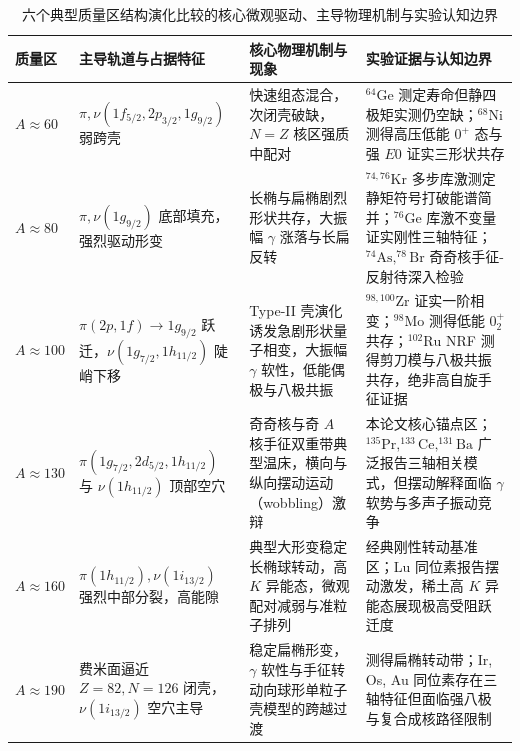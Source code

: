 \begin{table}[htbp]
\centering
\small
\caption{六个典型质量区结构演化比较的核心微观驱动、主导物理机制与实验认知边界}\label{tab:4-1-six-regions-framework}
\begin{tabularx}{\textwidth}{p{1.8cm}p{3.5cm}p{3.8cm}X}
\toprule
质量区 & 主导轨道与占据特征 & 核心物理机制与现象 & 实验证据与认知边界 \\
\midrule
$A \approx 60$ & $\pi,\nu(1f_{5/2}, 2p_{3/2}, 1g_{9/2})$ 弱跨壳 & 快速组态混合，次闭壳破缺，$N=Z$ 核区强质中配对 & $^{64}\mathrm{Ge}$ 测定寿命但静四极矩实测仍空缺；$^{68}\mathrm{Ni}$ 测得高压低能 $0^+$ 态与强 $E0$ 证实三形状共存 \\
\addlinespace
$A \approx 80$ & $\pi,\nu(1g_{9/2})$ 底部填充，强烈驱动形变 & 长椭与扁椭剧烈形状共存，大振幅 $\gamma$ 涨落与长扁反转 & $^{74,76}\mathrm{Kr}$ 多步库激测定静矩符号打破能谱简并；$^{76}\mathrm{Ge}$ 库激不变量证实刚性三轴特征；$^{74}\mathrm{As},^{78}\mathrm{Br}$ 奇奇核手征-反射待深入检验 \\
\addlinespace
$A \approx 100$ & $\pi(2p, 1f) \to 1g_{9/2}$ 跃迁，$\nu(1g_{7/2}, 1h_{11/2})$ 陡峭下移 & Type-II 壳演化诱发急剧形状量子相变，大振幅 $\gamma$ 软性，低能偶极与八极共振 & $^{98,100}\mathrm{Zr}$ 证实一阶相变；$^{98}\mathrm{Mo}$ 测得低能 $0_2^+$ 共存；$^{102}\mathrm{Ru}$ NRF 测得剪刀模与八极共振共存，绝非高自旋手征证据 \\
\addlinespace
$A \approx 130$ & $\pi(1g_{7/2}, 2d_{5/2}, 1h_{11/2})$ 与 $\nu(1h_{11/2})$ 顶部空穴 & 奇奇核与奇 $A$ 核手征双重带典型温床，横向与纵向摆动运动（wobbling）激辩 & 本论文核心锚点区；$^{135}\mathrm{Pr}, ^{133}\mathrm{Ce}, ^{131}\mathrm{Ba}$ 广泛报告三轴相关模式，但摆动解释面临 $\gamma$ 软势与多声子振动竞争 \\
\addlinespace
$A \approx 160$ & $\pi(1h_{11/2}), \nu(1i_{13/2})$ 强烈中部分裂，高能隙 & 典型大形变稳定长椭球转动，高 $K$ 异能态，微观配对减弱与准粒子排列 & 经典刚性转动基准区；Lu 同位素报告摆动激发，稀土高 $K$ 异能态展现极高受阻跃迁度 \\
\addlinespace
$A \approx 190$ & 费米面逼近 $Z=82, N=126$ 闭壳，$\nu(1i_{13/2})$ 空穴主导 & 稳定扁椭形变，$\gamma$ 软性与手征转动向球形单粒子壳模型的跨越过渡 & 测得扁椭转动带；Ir, Os, Au 同位素存在三轴特征但面临强八极与复合成核路径限制 \\
\bottomrule
\end{tabularx}
\end{table}
